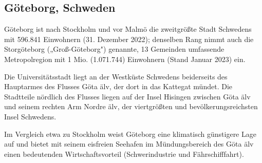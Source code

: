 \documentclass[a4paper,12pt]{article}
\begin{document}
\subsection{Göteborg, Schweden}

Göteborg ist nach Stockholm und vor Malmö die zweitgrößte Stadt Schwedens mit \mbox{596.841} Einwohnern (31. Dezember 2022); denselben Rang nimmt auch die Storgöteborg („Groß-Göteborg") genannte, 13 Gemeinden umfassende Metropolregion mit 1 Mio. (\mbox{1.071.744}) Einwohnern (Stand Januar 2023) ein.

Die Universitätsstadt liegt an der Westküste Schwedens beiderseits des Hauptarmes des Flusses Göta älv, der dort in das Kattegat mündet. Die Stadtteile nördlich des Flusses liegen auf der Insel Hisingen zwischen Göta älv und seinem rechten Arm Nordre älv, der viertgrößten und bevölkerungsreichsten Insel Schwedens.

Im Vergleich etwa zu Stockholm weist Göteborg eine klimatisch günstigere Lage auf und bietet mit seinem eisfreien Seehafen im Mündungsbereich des Göta älv einen bedeutenden Wirtschaftsvorteil (Schwerindustrie und Fährschifffahrt).
\end{document}
